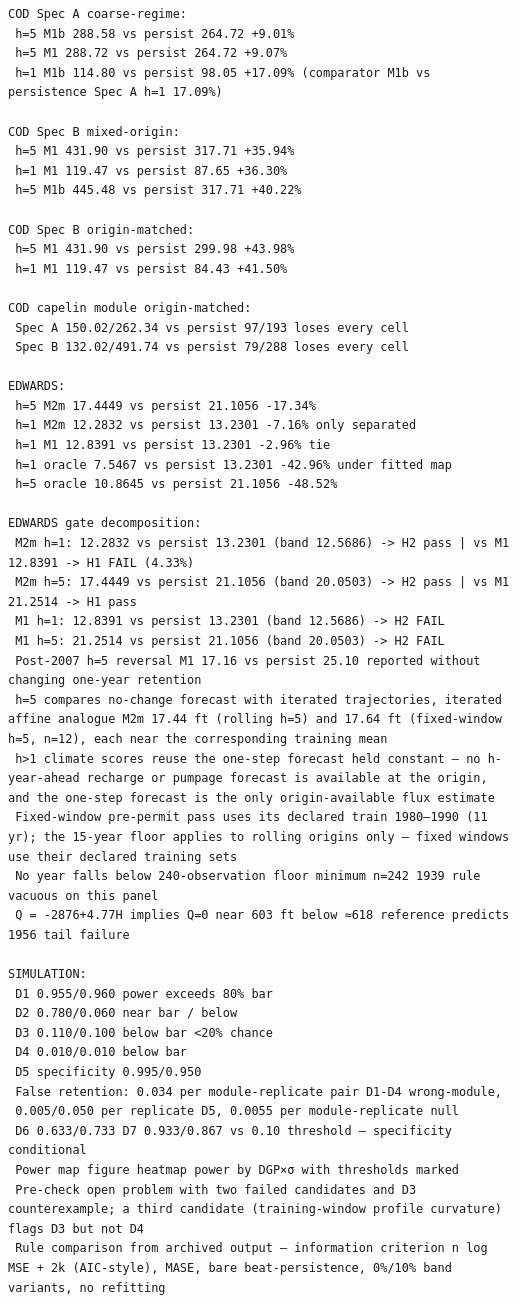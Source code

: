 \documentclass[11pt]{article}
\begin{document}
\begin{verbatim}
COD Spec A coarse-regime:
 h=5 M1b 288.58 vs persist 264.72 +9.01%
 h=5 M1 288.72 vs persist 264.72 +9.07%
 h=1 M1b 114.80 vs persist 98.05 +17.09% (comparator M1b vs persistence Spec A h=1 17.09%)

COD Spec B mixed-origin:
 h=5 M1 431.90 vs persist 317.71 +35.94%
 h=1 M1 119.47 vs persist 87.65 +36.30%
 h=5 M1b 445.48 vs persist 317.71 +40.22%

COD Spec B origin-matched:
 h=5 M1 431.90 vs persist 299.98 +43.98%
 h=1 M1 119.47 vs persist 84.43 +41.50%

COD capelin module origin-matched:
 Spec A 150.02/262.34 vs persist 97/193 loses every cell
 Spec B 132.02/491.74 vs persist 79/288 loses every cell

EDWARDS:
 h=5 M2m 17.4449 vs persist 21.1056 -17.34%
 h=1 M2m 12.2832 vs persist 13.2301 -7.16% only separated
 h=1 M1 12.8391 vs persist 13.2301 -2.96% tie
 h=1 oracle 7.5467 vs persist 13.2301 -42.96% under fitted map
 h=5 oracle 10.8645 vs persist 21.1056 -48.52%

EDWARDS gate decomposition:
 M2m h=1: 12.2832 vs persist 13.2301 (band 12.5686) -> H2 pass | vs M1 12.8391 -> H1 FAIL (4.33%)
 M2m h=5: 17.4449 vs persist 21.1056 (band 20.0503) -> H2 pass | vs M1 21.2514 -> H1 pass
 M1 h=1: 12.8391 vs persist 13.2301 (band 12.5686) -> H2 FAIL
 M1 h=5: 21.2514 vs persist 21.1056 (band 20.0503) -> H2 FAIL
 Post-2007 h=5 reversal M1 17.16 vs persist 25.10 reported without changing one-year retention
 h=5 compares no-change forecast with iterated trajectories, iterated affine analogue M2m 17.44 ft (rolling h=5) and 17.64 ft (fixed-window h=5, n=12), each near the corresponding training mean
 h>1 climate scores reuse the one-step forecast held constant — no h-year-ahead recharge or pumpage forecast is available at the origin, and the one-step forecast is the only origin-available flux estimate
 Fixed-window pre-permit pass uses its declared train 1980–1990 (11 yr); the 15-year floor applies to rolling origins only — fixed windows use their declared training sets
 No year falls below 240-observation floor minimum n=242 1939 rule vacuous on this panel
 Q = -2876+4.77H implies Q=0 near 603 ft below ≈618 reference predicts 1956 tail failure

SIMULATION:
 D1 0.955/0.960 power exceeds 80% bar
 D2 0.780/0.060 near bar / below
 D3 0.110/0.100 below bar <20% chance
 D4 0.010/0.010 below bar
 D5 specificity 0.995/0.950
 False retention: 0.034 per module-replicate pair D1-D4 wrong-module,
 0.005/0.050 per replicate D5, 0.0055 per module-replicate null
 D6 0.633/0.733 D7 0.933/0.867 vs 0.10 threshold — specificity conditional
 Power map figure heatmap power by DGP×σ with thresholds marked
 Pre-check open problem with two failed candidates and D3 counterexample; a third candidate (training-window profile curvature) flags D3 but not D4
 Rule comparison from archived output — information criterion n log MSE + 2k (AIC-style), MASE, bare beat-persistence, 0%/10% band variants, no refitting
\end{verbatim}
\end{document}
